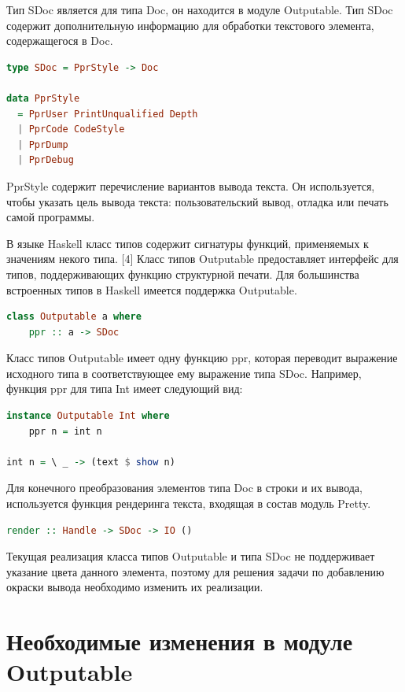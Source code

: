 Тип SDoc является для типа Doc, он находится в модуле Outputable. Тип SDoc содержит дополнительную информацию для обработки текстового элемента, содержащегося в Doc.
\begin{lstlisting}[language=Haskell]
type SDoc = PprStyle -> Doc

data PprStyle
  = PprUser PrintUnqualified Depth
  | PprCode CodeStyle
  | PprDump
  | PprDebug
\end{lstlisting}

PprStyle содержит перечисление вариантов вывода текста. Он используется, чтобы указать цель вывода текста: пользовательский вывод, отладка или печать самой программы.

В языке Haskell класс типов содержит сигнатуры функций, применяемых к значениям некого типа. [4] Класс типов Outputable предоставляет интерфейс для типов, поддерживающих функцию структурной печати. Для большинства встроенных типов в Haskell имеется поддержка Outputable.

\begin{lstlisting}[language=Haskell]
class Outputable a where
	ppr :: a -> SDoc
\end{lstlisting}

Класс типов Outputable имеет одну функцию ppr, которая переводит выражение исходного типа в соответствующее ему выражение типа SDoc. Например, функция ppr для типа Int имеет следующий вид:

\begin{lstlisting}[language=Haskell]
instance Outputable Int where
    ppr n = int n

int n = \ _ -> (text $ show n)

\end{lstlisting}

Для конечного преобразования элементов типа Doc в строки и их вывода, используется функция рендеринга текста, входящая в состав модуль Pretty.

\begin{lstlisting}[language=Haskell, caption=Типовая аннотация к функции рендеринга текста]
render :: Handle -> SDoc -> IO ()
\end{lstlisting}

Текущая реализация класса типов Outputable и типа SDoc не поддерживает указание цвета данного элемента, поэтому для решения задачи по добавлению окраски вывода необходимо изменить их реализации.

\section{Необходимые изменения в модуле Outputable}

